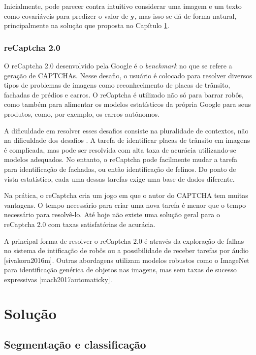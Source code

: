 \documentclass[12pt,]{report}
\begin{document}
Inicialmente, pode parecer contra intuitivo considerar uma imagem e um
texto como covariáveis para predizer o valor de \(\mathbf y\), mas isso
se dá de forma natural, principalmente na solução que proposta no
Capítulo \ref{results}.

\subsection{reCaptcha 2.0}\label{recaptcha-2.0}

O reCaptcha 2.0 desenvolvido pela Google é o \emph{benchmark} no que se
refere a geração de CAPTCHAs. Nesse desafio, o usuário é colocado para
resolver diversos tipos de problemas de imagens como reconhecimento de
placas de trânsito, fachadas de prédios e carros. O reCaptcha é
utilizado não só para barrar robôs, como também para alimentar os
modelos estatísticos da própria Google para seus produtos, como, por
exemplo, os carros autônomos.

A dificuldade em resolver esses desafios consiste na pluralidade de
contextos, não na dificuldade dos desafios \citep{goodfellow2013multi}.
A tarefa de identificar placas de trânsito em imagens é complicada, mas
pode ser resolvida com alta taxa de acurácia utilizando-se modelos
adequados. No entanto, o reCaptcha pode facilmente mudar a tarefa para
identificação de fachadas, ou então identificação de felinos. Do ponto
de vista estatístico, cada uma dessas tarefas exige uma base de dados
diferente.

Na prática, o reCaptcha cria um jogo em que o autor do CAPTCHA tem
muitas vantagens. O tempo necessário para criar uma nova tarefa é menor
que o tempo necessário para resolvê-lo. Até hoje não existe uma solução
geral para o reCaptcha 2.0 com taxas satisfatórias de acurácia.

A principal forma de resolver o reCaptcha 2.0 é através da exploração de
falhas no sistema de intificação de robôs ou a possibilidade de receber
tarefas por áudio {[}sivakorn2016m{]}. Outras abordagens utilizam
modelos robustos como o ImageNet para identificação genérica de objetos
nas imagens, mas sem taxas de sucesso expressivas
{[}mach2017automaticky{]}.

\chapter{Solução}\label{results}

\section{Segmentação e classificação}\label{segmentacao-e-classificacao}
\end{document}
